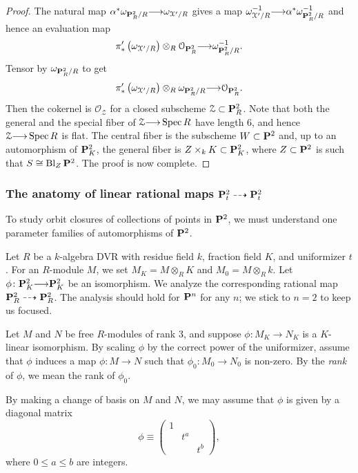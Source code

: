\documentclass[11pt,reqno, letterpaper]{amsart}
\renewcommand{\k}{k}
\DeclareMathOperator{\Bl}{Bl}
\renewcommand{\to}{{\longrightarrow}}
\numberwithin{equation}{section}
\renewcommand{\O}{\mathcal O}
\begin{document}
\begin{proof}
  The natural map $\alpha^* \omega_{\P^2_R/R} \to \omega_{\mathcal X'/R}$ gives a map $\omega^{-1}_{\mathcal X'/R} \to \alpha^* \omega^{-1}_{\P^2_R/R}$ and hence an evaluation map
  \[ \pi'_* \left(\omega_{\mathcal X'/R}\right) \otimes_R \O_{\P^2_R} \to \omega_{\P^2_R/R}^{-1}.\]
  Tensor by $\omega_{\P^2_R/R}$ to get
  \[ \pi'_* \left(\omega_{\mathcal X'/R}\right) \otimes_R \omega_{\P^2_R/R} \to \O_{\P^2_R}.\]
  Then the cokernel is $\O_{\mathcal Z}$ for a closed subscheme $\mathcal Z \subset \P^2_R$.
  Note that both the general and the special fiber of $\mathcal Z \to \spec R$ have length 6, and hence $\mathcal Z \to \spec R$ is flat.
  The central fiber is the subscheme $W \subset \P^2$ and, up to an automorphism of $\P^2_K$, the general fiber is $Z \times_k K \subset \P^2_K$, where $Z \subset \P^2$ is such that $S \cong \Bl_Z \P^2$.
  The proof is now complete.
\end{proof}

\subsubsection{The anatomy of linear rational maps $\P_t^2 \dashrightarrow \P_t^2$}\label{sec:ratmap}
To study orbit closures of collections of points in $\P^2$, we must understand one parameter families of automorphisms of $\P^2$.

Let $R$ be a $\k$-algebra DVR with residue field $\k$, fraction field $K$, and uniformizer $t$.
For an $R$-module $M$, we set $M_K = M \otimes_R K$ and $M_0 = M \otimes_R \k$.
Let $\phi \colon \P^2_K \to \P^2_K$ be an isomorphism.
We analyze the corresponding rational map $\P^2_R \dashrightarrow \P^2_R$.
The analysis should hold for $\P^n$ for any $n$; we stick to $n = 2$ to keep us focused.

Let $M$ and $N$ be free $R$-modules of rank 3, and suppose $\phi \colon M_K \to N_K$ is a $K$-linear isomorphism.
By scaling $\phi$ by the correct power of the uniformizer, assume that $\phi$ induces a map $\phi \colon M \to N$ such that $\phi_0 \colon M_0 \to N_0$ is non-zero.
By the \emph{rank} of $\phi$, we mean the rank of $\phi_0$.

By making a change of basis on $M$ and $N$, we may assume that $\phi$ is given by a diagonal matrix
\[
  \phi \equiv
  \begin{pmatrix}
    1 & & \\
     & t^a & \\
    & & t^b
  \end{pmatrix},
\]
where $0 \leq a \leq b$ are integers.
\end{document}

